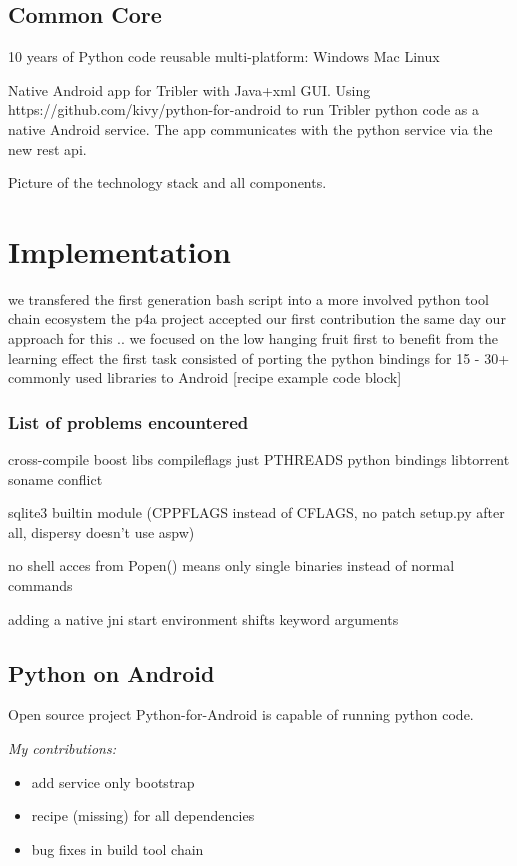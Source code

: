 \documentclass[]{report}
\begin{document}
\section{Common Core}
10 years of Python code 
reusable multi-platform: Windows Mac Linux


Native Android app for Tribler with Java+xml GUI.
Using https://github.com/kivy/python-for-android to run Tribler python code as a native Android service.
The app communicates with the python service via the new rest api.

Picture of the technology stack and all components.


\chapter{Implementation}


we transfered the first generation bash script into a more involved python tool chain ecosystem
the p4a project accepted our first contribution the same day
our approach for this .. we focused on the low hanging fruit first to benefit from the learning effect
the first task consisted of porting the python bindings for 15 - 30+ commonly used libraries to Android [recipe example code block]

\subsection*{List of problems encountered}
cross-compile boost libs compileflags just PTHREADS
python bindings libtorrent soname conflict


sqlite3 builtin module (CPPFLAGS instead of CFLAGS, no patch setup.py after all, dispersy doesn't use aspw)


no shell acces from Popen() means only single binaries instead of normal commands

adding a native jni start environment shifts keyword arguments



\section{Python on Android}
Open source project Python-for-Android is capable of running python code.

\emph{My contributions:}
\begin{itemize}
	\item add service only bootstrap
	\item recipe (missing) for all dependencies
	\item bug fixes in build tool chain
\end{itemize}
\end{document}

